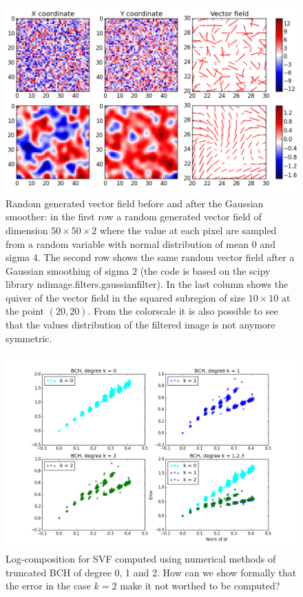 \begin{figure}[!ht]
	\hspace{-1.4cm}
	\includegraphics[scale=0.75]{figures/gaussian_smoothing_effect.png}
	\caption{Random generated vector field before and after the Gaussian smoother: in the first row a random generated vector field of dimension $50\times 50 \times 2$ where the value at each pixel are sampled from a random variable with normal distribution of mean $0$ and sigma $4$. The second row shows the same random vector field after a Gaussian smoothing of sigma $2$ (the code is based on the scipy library ndimage.filters.gaussian\textunderscore filter). In the last column shows the quiver of the vector field in the squared subregion of size $10\times 10$ at the point $(20,20)$. From the colorscale it is also possible to see that the values distribution of the filtered image is not anymore symmetric. }
	\label{fig:svf_gaussian_smoothing_effects}
\end{figure}


\begin{figure}[!ht]
	\hspace{-3cm}
	\includegraphics[scale=0.65]{figures/SVF_four_bch.png}
	\caption{Log-composition for SVF computed using numerical methods of truncated BCH of degree 0, 1 and 2. How can we show formally that the error in the case $k=2$ make it not worthed to be computed?}
	\label{fig:SVF_four_bch}
\end{figure}

